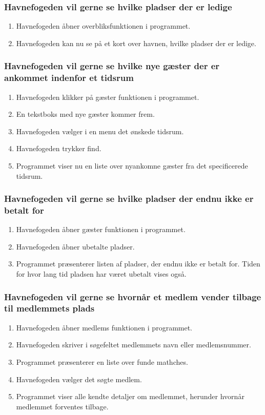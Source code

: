 \subsubsection{Havnefogeden vil gerne se hvilke pladser der er ledige}
    \begin{enumerate}
      \item Havnefogeden åbner overbliksfunktionen i programmet.
      \item Havnefogeden kan nu se på et kort over havnen, hvilke pladser der er ledige.
    \end{enumerate}

    \subsubsection{Havnefogeden vil gerne se hvilke nye gæster der er ankommet indenfor et tidsrum}
    \begin{enumerate}
      \item Havnefogeden klikker på gæster funktionen i programmet.
      \item En tekstboks med nye gæster kommer frem.
      \item Havnefogeden vælger i en menu det ønskede tidsrum.
      \item Havnefogeden trykker find.
      \item Programmet viser nu en liste over nyankomne gæster fra det specificerede tidsrum.
    \end{enumerate}

    \subsubsection{Havnefogeden vil gerne se hvilke pladser der endnu ikke er betalt for}
    \begin{enumerate}
      \item Havnefogeden åbner gæster funktionen i programmet.
      \item Havnefogeden åbner ubetalte pladser.
      \item Programmet præsenterer listen af pladser, der endnu ikke er betalt for. Tiden for hvor lang tid pladsen har været ubetalt vises også.
    \end{enumerate}

    \subsubsection{Havnefogeden vil gerne se hvornår et medlem vender tilbage til medlemmets plads}
    \begin{enumerate}
      \item Havnefogeden åbner medlems funktionen i programmet.
      \item Havnefogeden skriver i søgefeltet medlemmets navn eller medlemsnummer.
      \item Programmet præsenterer en liste over funde mathches.
      \item Havnefogeden vælger det søgte medlem.
      \item Programmet viser alle kendte detaljer om medlemmet, herunder hvornår medlemmet forventes tilbage.
    \end{enumerate}

